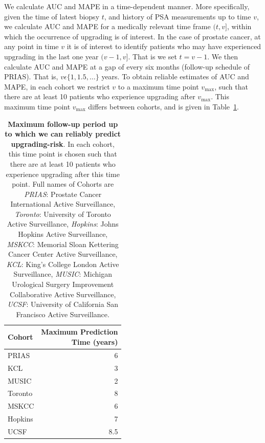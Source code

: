 We calculate AUC and MAPE in a time-dependent manner. More specifically, given the time of latest biopsy $t$, and history of PSA measurements up to time $v$, we calculate AUC and MAPE for a medically relevant time frame $(t, v]$, within which the occurrence of upgrading is of interest. In the case of prostate cancer, at any point in time $v$ it is of interest to identify patients who may have experienced upgrading in the last one year $(v-1, v]$. That is we set $t=v-1$. We then calculate AUC and MAPE at a gap of every six months (follow-up schedule of PRIAS). That is, $v \epsilon \{1, 1.5, \ldots \}$ years. To obtain reliable estimates of AUC and MAPE, in each cohort we restrict $v$ to a maximum time point $v_{\mbox{max}}$, such that there are at least 10 patients who experience upgrading after $v_{\mbox{max}}$. This maximum time point $v_{\mbox{max}}$ differs between cohorts, and is given in Table~\ref{tab:max_pred_time}.

\begin{table}[!htb]
\small\sf\centering
\caption{\textbf{Maximum follow-up period up to which we can reliably predict upgrading-risk}. In each cohort, this time point is chosen such that there are at least 10 patients who experience upgrading after this time point. Full names of Cohorts are \textit{PRIAS}: Prostate Cancer International Active Surveillance, \textit{Toronto}: University of Toronto Active Surveillance, \textit{Hopkins}: Johns Hopkins Active Surveillance, \textit{MSKCC}: Memorial Sloan Kettering Cancer Center Active Surveillance, \textit{KCL}: King's College London Active Surveillance, \textit{MUSIC}: Michigan Urological Surgery Improvement Collaborative Active Surveillance, \textit{UCSF}: University of California San Francisco Active Surveillance.}
\label{tab:max_pred_time}
\begin{tabular}{l|r}
\hline
\hline
Cohort & \parbox[t]{3.5cm}{Maximum Prediction\\Time (years)}\\
\hline
PRIAS & 6\\
KCL & 3\\
MUSIC & 2\\
Toronto & 8\\
MSKCC & 6\\
Hopkins & 7\\
UCSF & 8.5\\
\hline
\end{tabular}	
\end{table}

